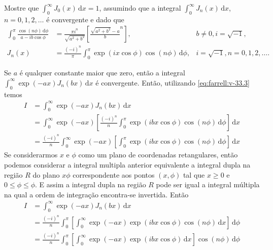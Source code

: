 \documentclass[a4paper,12pt, leqno, answers]{exam}
\begin{document}
\begin{questions}
     Mostre que $\int_0^\infty J_0(x) \,\mathrm{d}x = 1$, assumindo que a integral $\int_0^\infty J_n(x) \,\mathrm{d}x$, $n = 0, 1, 2, \ldots$ \'{e} convergente e dado que
    \begin{align}
        \int_0^\pi \frac{\cos(n \phi) \,\mathrm{d}\phi}{a - i b \cos \phi} &= \frac{\pi i^n}{\sqrt{a^2 + b^2}} \left[ \frac{\sqrt{a^2 + b^2} - a}{b}^n \right], & b \neq 0, i = \sqrt{-1}, \tag{$\bigstar$} \label{eq:farrell:v-33.2} \\
        J_n(x) &= \frac{(-i)^n}{\pi} \int_0^\pi \exp(i x \cos \phi) \cos(n \phi) \,\mathrm{d}\phi, & i = \sqrt{-1}, n = 0, 1, 2, \ldots. \tag{$\bigstar\bigstar$} \label{eq:farrell:v-33.3}
    \end{align}
    \begin{solution}
        Se $a$ \'{e} qualquer constante maior que zero, ent\~{a}o a integral $\int_0^\infty \exp(-a x) J_n(bx) \,\mathrm{d}x$ \'{e} convergente. Ent\~{a}o, utilizando \eqref{eq:farrell:v-33.3} temos
        \begin{align*}
            I &= \int_0^\infty \exp(-a x) J_n(bx) \,\mathrm{d}x \\
            &= \int_0^\infty \exp(-a x) \left[ \frac{(-i)^n}{n} \int_0^\pi \exp(i b x \cos \phi) \cos(n \phi) \,\mathrm{d}\phi \right] \,\mathrm{d}x \\
            &= \frac{(-i)^n}{n} \int_0^\infty \exp(-a x) \left[ \int_0^\pi \exp(i b x \cos \phi) \cos(n \phi) \,\mathrm{d}\phi \right] \,\mathrm{d}x 
        \end{align*}
        Se considerarmos $x$ e $\phi$ como um plano de coordenadas retangulares, ent\~{a}o podemos considerar a integral multipla anterior equivalente a integral dupla na regi\~{a}o $R$ do plano $x\phi$ correspondente aos pontos $(x, \phi)$ tal que $x \geq 0$ e $0 \leq \phi \leq \phi$. E assim a integral dupla na regi\~{a}o $R$ pode ser igual a integral m\'{u}ltipla na qual a ordem de integra\c{c}\~{a}o encontra-se invertida. Ent\~{a}o
        \begin{align*}
            I &= \int_0^\infty \exp(-a x) J_n(bx) \,\mathrm{d}x \\
            &= \frac{(-i)^n}{n} \int_0^\pi \left[ \int_0^\infty \exp(-a x) \exp(i b x \cos \phi) \cos(n \phi) \,\mathrm{d}x \right] \,\mathrm{d}\phi \\
            &= \frac{(-i)^n}{n} \int_0^\pi \left[ \int_0^\infty \exp(-a x) \exp(i b x \cos \phi) \,\mathrm{d}x \right] \cos(n \phi) \,\mathrm{d}\phi \\

\end{align*}
\end{solution}
\end{questions}
\end{document}
